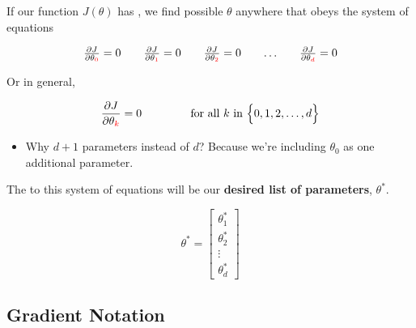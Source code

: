         \begin{concept}
            If our function $J(\theta)$ has  , we find possible  $\theta$ anywhere that obeys the system of equations
            
            \begin{equation*}
                \begin{matrix}
                    \frac{\partial J}{\partial \theta_{\textcolor{red}{0}}} = 0 &&
                \frac{\partial J}{\partial \theta_{\textcolor{red}{1}}} = 0 &&
                \frac{\partial J}{\partial \theta_{\textcolor{red}{2}}} = 0 &&
                \dots &&
                \frac{\partial J}{\partial \theta_{\textcolor{red}{d}}} = 0
                \end{matrix}
            \end{equation*}
            
            Or in general, 
            
            \begin{equation*}
                \frac{\partial J}{\partial \theta_{\textcolor{red}{k}}} = 0 \qquad \qquad \text{ for all $k$ in $\Bigl\{0, 1, 2, \dots, d \Bigr\}$}
            \end{equation*}

            \begin{itemize}
                \item Why $d+1$ parameters instead of $d$? Because we're including $\theta_0$ as one additional parameter.
            \end{itemize}
            
        \end{concept}
        
        
        The  to this system of equations will be our \textbf{desired list of parameters}, $\theta^*$.

        \begin{equation}
            \theta^* = 
            \begin{bmatrix}
                \theta^*_1 \\ \theta^*_2 \\ \vdots \\ \theta^*_d
            \end{bmatrix}
        \end{equation}

    \phantom{}
        
    \subsection{Gradient Notation}

